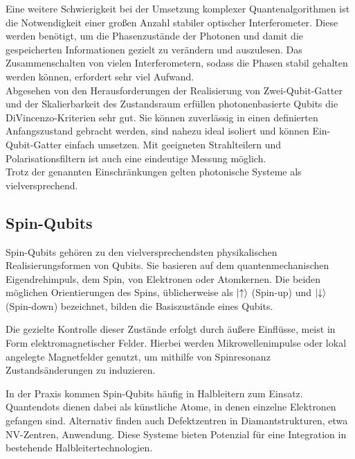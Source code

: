 Eine weitere Schwierigkeit bei der Umsetzung komplexer Quantenalgorithmen ist die Notwendigkeit einer großen Anzahl stabiler optischer Interferometer. Diese werden benötigt, um die Phasenzustände der Photonen und damit die gespeicherten Informationen gezielt zu verändern und auszulesen. Das Zusammenschalten von vielen Interferometern, sodass die Phasen stabil gehalten werden können, erfordert sehr viel Aufwand. \\


Abgesehen von den Herausforderungen der Realisierung von Zwei-Qubit-Gatter und der Skalierbarkeit des Zustandsraum erfüllen photonenbasierte Qubits die DiVincenzo-Kriterien sehr gut. Sie können zuverlässig in einen definierten Anfangszustand gebracht werden, sind nahezu ideal isoliert und können Ein-Qubit-Gatter einfach umsetzen. Mit geeigneten Strahlteilern und Polarisationsfiltern ist auch eine eindeutige Messung möglich. \\
Trotz der genannten Einschränkungen gelten photonische Systeme als vielversprechend. 
\cite{nielsen_michael_a_and_isaac_l_chuang_quantum_2010}








\subsection{Spin-Qubits}
\label{subsec: Spin-Qubits}
Spin-Qubits gehören zu den vielversprechendsten physikalischen Realisierungsformen von Qubits. Sie basieren auf dem quantenmechanischen Eigendrehimpuls, dem Spin, von Elektronen oder Atomkernen. Die beiden möglichen Orientierungen des Spins, üblicherweise als $\ket{\uparrow}$ (Spin-up) und $\ket{\downarrow}$ (Spin-down) bezeichnet, bilden die Basiszustände eines Qubits.

Die gezielte Kontrolle dieser Zustände erfolgt durch äußere Einflüsse, meist in Form elektromagnetischer Felder. Hierbei werden Mikrowellenimpulse oder lokal angelegte Magnetfelder genutzt, um mithilfe von Spinresonanz Zustandsänderungen zu induzieren.

In der Praxis kommen Spin-Qubits häufig in Halbleitern zum Einsatz. Quantendots dienen dabei als künstliche Atome, in denen einzelne Elektronen gefangen sind. Alternativ finden auch Defektzentren in Diamantstrukturen, etwa NV-Zentren, Anwendung. Diese Systeme bieten Potenzial für eine Integration in bestehende Halbleitertechnologien.

